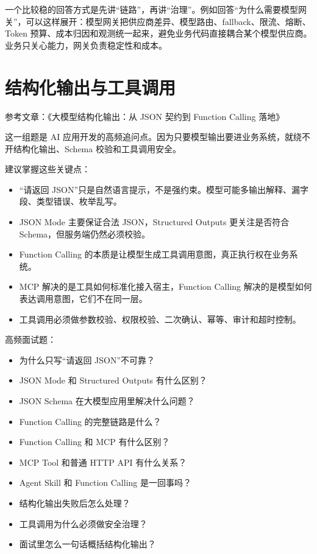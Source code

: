 \documentclass[9pt,a4paper,twocolumn]{ctexart}
\begin{document}
一个比较稳的回答方式是先讲“链路”，再讲“治理”。例如回答“为什么需要模型网关”，可以这样展开：模型网关把供应商差异、模型路由、fallback、限流、熔断、Token 预算、成本归因和观测统一起来，避免业务代码直接耦合某个模型供应商。业务只关心能力，网关负责稳定性和成本。



\section*{结构化输出与工具调用}


参考文章：《大模型结构化输出：从 JSON 契约到 Function Calling 落地》



这一组题是 AI 应用开发的高频追问点。因为只要模型输出要进业务系统，就绕不开结构化输出、Schema 校验和工具调用安全。



建议掌握这些关键点：


\begin{itemize}[itemsep=1pt, topsep=2pt]
  \item “请返回 JSON”只是自然语言提示，不是强约束。模型可能多输出解释、漏字段、类型错误、枚举乱写。
  \item JSON Mode 主要保证合法 JSON，Structured Outputs 更关注是否符合 Schema，但服务端仍然必须校验。
  \item Function Calling 的本质是让模型生成工具调用意图，真正执行权在业务系统。
  \item MCP 解决的是工具如何标准化接入宿主，Function Calling 解决的是模型如何表达调用意图，它们不在同一层。
  \item 工具调用必须做参数校验、权限校验、二次确认、幂等、审计和超时控制。
\end{itemize}


高频面试题：


\begin{itemize}[itemsep=1pt, topsep=2pt]
  \item 为什么只写“请返回 JSON”不可靠？
  \item JSON Mode 和 Structured Outputs 有什么区别？
  \item JSON Schema 在大模型应用里解决什么问题？
  \item Function Calling 的完整链路是什么？
  \item Function Calling 和 MCP 有什么区别？
  \item MCP Tool 和普通 HTTP API 有什么关系？
  \item Agent Skill 和 Function Calling 是一回事吗？
  \item 结构化输出失败后怎么处理？
  \item 工具调用为什么必须做安全治理？
  \item 面试里怎么一句话概括结构化输出？
\end{itemize}
\end{document}
